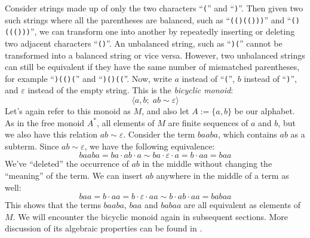 \documentclass[../generics]{subfiles}
\begin{document}

\begin{example}\label{bicyclic}
Consider strings made up of only the two characters ``\texttt{(}'' and ``\texttt{)}''. Then given two such strings where all the parentheses are balanced, such as ``\texttt{(()(()))}'' and ``\texttt{()((()))}'', we can transform one into another by repeatedly inserting or deleting two adjacent characters ``\texttt{()}''. An unbalanced string, such as ``\texttt{)(}'' cannot be transformed into a balanced string or vice versa. However, two unbalanced strings can still be equivalent if they have the same number of mismatched parentheses, for example ``\texttt{)(()(}'' and ``\texttt{)()((}''. Now, write $a$ instead of ``\texttt{(}'', $b$ instead of ``\texttt{)}'', and $\varepsilon$ instead of the empty string. This is the \emph{bicyclic monoid}:
\[\langle a, b;\; ab\sim\varepsilon\rangle\]
Let's again refer to this monoid as $M$, and also let $A:=\{a,b\}$ be our alphabet. As in the free monoid $A^*$, all elements of $M$ are finite sequences of $a$ and $b$, but we also have this relation $ab\sim\varepsilon$. Consider the term $baaba$, which contains $ab$ as a subterm. Since $ab\sim\varepsilon$, we have the following equivalence:
\[baaba=ba\cdot ab\cdot a\sim ba\cdot\varepsilon\cdot a=b\cdot aa = baa\]
We've ``deleted'' the occurrence of $ab$ in the middle without changing the ``meaning'' of the term. We can insert $ab$ anywhere in the middle of a term as well:
\[baa=b\cdot aa=b\cdot\varepsilon\cdot aa\sim b\cdot ab\cdot aa=babaa\]
This shows that the terms $baaba$, $baa$ and $babaa$ are all equivalent as elements of $M$. We will encounter the bicyclic monoid again in subsequent sections. More discussion of its algebraic properties can be found in \cite{semigroup}.
\end{example}
\end{document}

